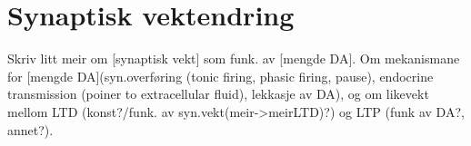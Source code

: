 
\chapter{Synaptisk vektendring}
Skriv litt meir om [synaptisk vekt] som funk. av [mengde DA]. Om mekanismane for [mengde DA](syn.overføring (tonic firing, phasic firing, pause), endocrine transmission (poiner to extracellular fluid), lekkasje av DA), og om likevekt mellom LTD (konst?/funk. av syn.vekt(meir->meirLTD)?) og LTP (funk av DA?, annet?).
